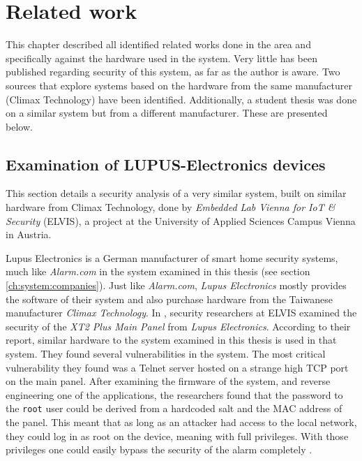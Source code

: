 \chapter{Related work} \label{ch:related-work}
This chapter described all identified related works done in the area and specifically against the hardware used in the system. Very little has been published regarding security of this system, as far as the author is aware. Two sources that explore systems based on the hardware from the same manufacturer (Climax Technology) have been identified. Additionally, a student thesis was done on a similar system but from a different manufacturer. These are presented below.

\section{Examination of LUPUS-Electronics devices} \label{ch:related-work:lupus}
This section details a security analysis of a very similar system, built on similar hardware from Climax Technology, done by \textit{Embedded Lab Vienna for IoT \& Security} (ELVIS), a project at the University of Applied Sciences Campus Vienna in Austria.

Lupus Electronics is a German manufacturer of smart home security systems, much like \textit{Alarm.com} in the system examined in this thesis (see section \ref{ch:system:companies}). Just like \textit{Alarm.com}, \textit{Lupus Electronics} mostly provides the software of their system and also purchase hardware from the Taiwanese manufacturer \textit{Climax Technology}. In \citeyear{labvienna}, security researchers at ELVIS examined the security of the \textit{XT2 Plus Main Panel} from \textit{Lupus Electronics}. According to their report, similar hardware to the system examined in this thesis is used in that system. They found several vulnerabilities in the system. The most critical vulnerability they found was a Telnet server hosted on a strange high TCP port on the main panel. After examining the firmware of the system, and reverse engineering one of the applications, the researchers found that the password to the \texttt{root} user could be derived from a hardcoded salt and the MAC address of the panel. This meant that as long as an attacker had access to the local network, they could log in as root on the device, meaning with full privileges. With those privileges one could easily bypass the security of the alarm completely \citeyear{labvienna}.

